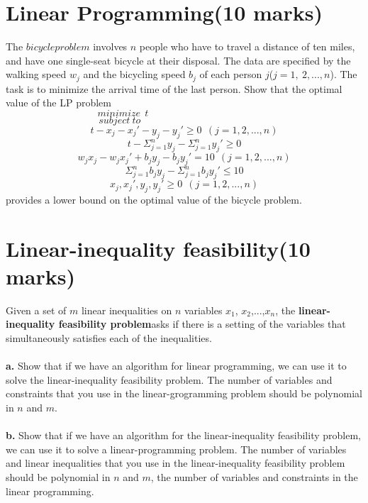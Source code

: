 \documentclass[a4paper,11pt]{article}
\begin{document}
\section{Linear Programming(10 marks)}
The $bicycle problem$ involves $n$ people who have to travel a distance of ten miles, and have one single-seat bicycle at their disposal. The data are specified by the walking speed $w_j$ and the bicycling speed $b_j$ of each person $j$($j=1,\ 2,...,n$). The task is to minimize the arrival time of the last person. Show that the optimal value of the LP problem
$$minimize\ \ t \ \ \ \ \ \ \ \ \ \ \ \ \ \ \ \ \ \ \ \ \ \ \ \ \ \ \ \ \ \ \ \ \ \ \ \ \ \ \ \ \ \ \ \ \ \ \ \ \ \ \ \ \ \ \ \ $$
$$subject\ to\ \ \ \ \ \ \ \ \ \ \ \ \ \ \ \ \ \ \ \ \ \ \ \ \ \ \ \ \ \ \ \ \ \ \ \ \ \ \ \ \ \ \ \ \ \ \ \ \ \ \ \ \ \ \ \ \ \ \ $$
$$t-x_j-x_j'-y_j-y_j'\geq 0\ \ (j=1,2,...,n)$$
$$t-\Sigma^n_{j=1} y_j-\Sigma^n_{j=1} y_j'\geq 0$$
$$w_jx_j-w_jx_j'+b_jy_j-b_jy_j'=10\ \ (j=1,2,...,n)$$
$$\Sigma^n_{j=1} b_jy_j-\Sigma^n_{j=1} b_jy_j'\leq 10$$
$$x_j,x_j',y_j,y_j'\geq 0\ \ (j=1,2,...,n)$$
provides a lower bound on the optimal value of the bicycle problem.

\section{Linear-inequality feasibility(10 marks)}
Given a set of $m$ linear inequalities on $n$ variables $x_1$, $x_2$,...,$x_n$, the {\bf linear-inequality feasibility problem}asks if there is a setting of the variables that simultaneously satisfies each of the inequalities.\\\\
{\bf a.} Show that if we have an algorithm for linear programming, we can use it to solve the linear-inequality feasibility problem. The number of variables and constraints that you use in the linear-grogramming problem should be polynomial in $n$ and $m$.\\\\
{\bf b.} Show that if we have an algorithm for the linear-inequality feasibility problem, we can use it to solve a linear-programming problem. The number of variables and linear inequalities that you use in the linear-inequality feasibility problem should be polynomial in $n$ and $m$, the number of variables and constraints in the linear programming.
\end{document}
